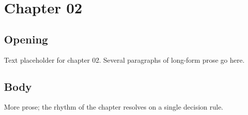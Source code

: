 \chapter{Chapter 02}
\section{Opening}
Text placeholder for chapter 02. Several paragraphs of long-form prose go here.
\section{Body}
More prose; the rhythm of the chapter resolves on a single decision rule.
